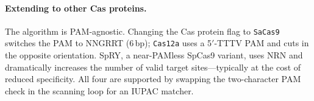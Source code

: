 \documentclass[11pt]{article}
\begin{document}
\paragraph{Extending to other Cas proteins.}
The algorithm is PAM-agnostic.  Changing the Cas protein flag to \texttt{SaCas9} switches
the PAM to NNGRRT (6\,bp); \texttt{Cas12a} uses a 5$'$-TTTV PAM and cuts in the opposite
orientation.  SpRY, a near-PAMless SpCas9 variant, uses NRN and dramatically increases the
number of valid target sites---typically at the cost of reduced specificity.  All four are
supported by swapping the two-character PAM check in the scanning loop for an IUPAC matcher.
\end{document}
